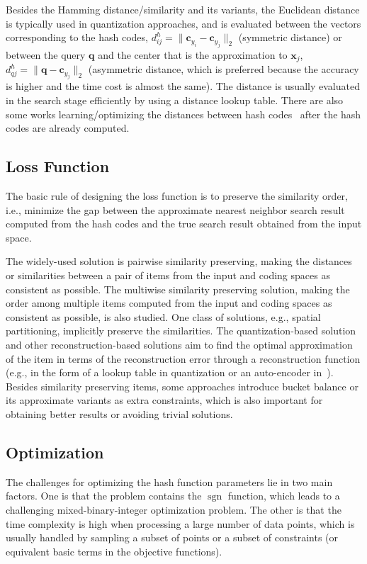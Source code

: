 \documentclass[10pt,journal,compsoc]{IEEEtran}
\begin{document}
Besides the Hamming distance/similarity and its variants,
the Euclidean distance is
typically used
in quantization approaches,
and is evaluated between the vectors
corresponding to the hash codes,
$d^h_{ij} = \|\mathbf{c}_{y_i} - \mathbf{c}_{y_j}\|_2$
(symmetric distance)
or between the query $\mathbf{q}$
and the center that is the approximation to $\mathbf{x}_j$,
$d^h_{qj} = \|\mathbf{q} - \mathbf{c}_{y_j}\|_2$
(asymmetric distance,
which is preferred
because the accuracy is higher
and the time cost is almost the same).
The distance is usually evaluated in the search stage efficiently
by using a distance lookup table.
There are also some works
learning/optimizing the distances between hash codes~\cite{GordoPGL14, WangSYYLW14}
after the hash codes are already computed.


\subsection{Loss Function}
The basic rule of designing the loss function
is to preserve the similarity order,
i.e.,
minimize the gap between
the approximate nearest neighbor search result
computed from the hash codes
and the true search result
obtained from the input space.

The widely-used solution
is pairwise similarity preserving,
making the distances or similarities
between a pair of items
from the input and coding spaces
as consistent as possible.
The multiwise similarity preserving solution,
making the order among multiple items
computed from the input and coding spaces
as consistent as possible,
is also studied.
One class of solutions,
e.g., spatial partitioning,
implicitly preserve the similarities.
The quantization-based solution
and other reconstruction-based solutions
aim to find the optimal approximation
of the item in terms of the reconstruction error
through a reconstruction function
(e.g., in the form of a lookup table in quantization
or an auto-encoder in~\cite{SalakhutdinovH07}).
Besides similarity preserving items,
some approaches introduce bucket balance or its approximate variants
as extra constraints,
which is also important for
obtaining better results
or avoiding trivial solutions.

\subsection{Optimization}
The challenges for optimizing the hash function parameters
lie in two main factors.
One is that the problem contains the $\operatorname{sgn}$ function,
which leads to a challenging mixed-binary-integer optimization problem.
The other is that
the time complexity is high when processing a large number of data points,
which is usually handled by sampling a subset of points
or a subset of constraints (or equivalent basic terms in the objective functions).
\end{document}
